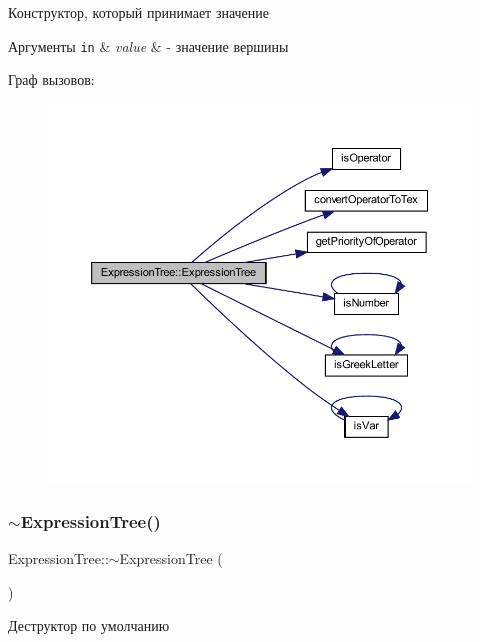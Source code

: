 Конструктор, который принимает значение 


\begin{DoxyParams}[1]{Аргументы}
\mbox{\tt in}  & {\em value} & -\/ значение вершины \\
\hline
\end{DoxyParams}
Граф вызовов\+:\nopagebreak
\begin{figure}[H]
\begin{center}
\leavevmode
\includegraphics[width=350pt]{class_expression_tree_aa158e3eced2b61eedabec90ff8f62a3b_cgraph}
\end{center}
\end{figure}
\mbox{\label{class_expression_tree_a7c172d77927af5a57fded65b1777fc17}} 
\subsubsection{\texorpdfstring{$\sim$\+Expression\+Tree()}{~ExpressionTree()}}
{\footnotesize\ttfamily Expression\+Tree\+::$\sim$\+Expression\+Tree (\begin{DoxyParamCaption}{ }\end{DoxyParamCaption})}



Деструктор по умолчанию 



